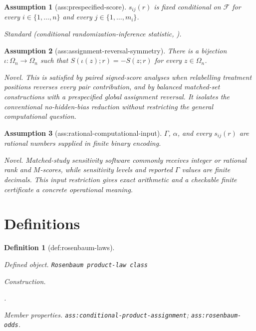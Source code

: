 \documentclass{article}
\newtheorem{assumption}{Assumption}
\newtheorem{definition}{Definition}
\begin{document}
\begin{assumption}[ass:prespecified-score]\label{ass:prespecified-score}
\(s_{ij}(r)\) is fixed conditional on \(\mathcal F\) for every \(i\in\{1,\ldots,n\}\) and every \(j\in\{1,\ldots,m_i\}\).
\par\smallskip\noindent\emph{Standard} (conditional randomization-inference statistic, \cite{Rosenbaum2007M}).
\end{assumption}

\begin{assumption}[ass:assignment-reversal-symmetry]\label{ass:assignment-reversal-symmetry}
There is a bijection \(\iota:\Omega_n\to\Omega_n\) such that \(S(\iota(z);r)=-S(z;r)\) for every \(z\in\Omega_n\).
\par\smallskip\noindent\emph{Novel.} This is satisfied by paired signed-score analyses when relabelling treatment positions reverses every pair contribution, and by balanced matched-set constructions with a prespecified global assignment reversal. It isolates the conventional no-hidden-bias reduction without restricting the general computational question.
\end{assumption}

\begin{assumption}[ass:rational-computational-input]\label{ass:rational-computational-input}
\(\Gamma\), \(\alpha\), and every \(s_{ij}(r)\) are rational numbers supplied in finite binary encoding.
\par\smallskip\noindent\emph{Novel.} Matched-study sensitivity software commonly receives integer or rational rank and \(M\)-scores, while sensitivity levels and reported \(\Gamma\) values are finite decimals. This input restriction gives exact arithmetic and a checkable finite certificate a concrete operational meaning.
\end{assumption}

\section{Definitions}

\begin{definition}[def:rosenbaum-laws]\label{def:rosenbaum-laws}
\par\smallskip\noindent\emph{Defined object.} \texttt{Rosenbaum product-\allowbreak{}law class}
\par\smallskip\noindent\emph{Construction.} \par\noindent {}\par\noindent.
\par\smallskip\noindent\emph{Member properties.} \texttt{ass:\allowbreak{}conditional-\allowbreak{}product-\allowbreak{}assignment}; \texttt{ass:\allowbreak{}rosenbaum-\allowbreak{}odds}.
\end{definition}
\end{document}
